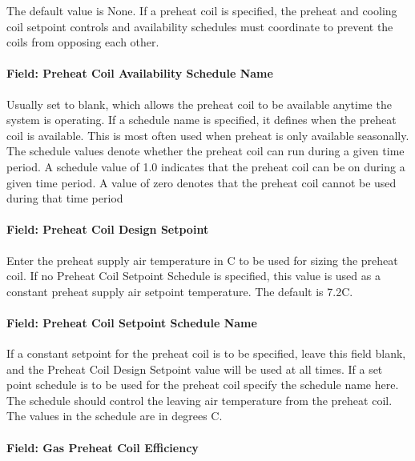 The default value is None. If a preheat coil is specified, the preheat and cooling coil setpoint controls and availability schedules must coordinate to prevent the coils from opposing each other.

\paragraph{Field: Preheat Coil Availability Schedule Name}\label{field-preheat-coil-availability-schedule-name-1}

Usually set to blank, which allows the preheat coil to be available anytime the system is operating. If a schedule name is specified, it defines when the preheat coil is available. This is most often used when preheat is only available seasonally. The schedule values denote whether the preheat coil can run during a given time period. A schedule value of 1.0 indicates that the preheat coil can be on during a given time period. A value of zero denotes that the preheat coil cannot be used during that time period

\paragraph{Field: Preheat Coil Design Setpoint}\label{field-preheat-coil-design-setpoint-1}

Enter the preheat supply air temperature in C to be used for sizing the preheat coil. If no Preheat Coil Setpoint Schedule is specified, this value is used as a constant preheat supply air setpoint temperature. The default is 7.2C.

\paragraph{Field: Preheat Coil Setpoint Schedule Name}\label{field-preheat-coil-setpoint-schedule-name-1}

If a constant setpoint for the preheat coil is to be specified, leave this field blank, and the Preheat Coil Design Setpoint value will be used at all times. If a set point schedule is to be used for the preheat coil specify the schedule name here. The schedule should control the leaving air temperature from the preheat coil. The values in the schedule are in degrees C.

\paragraph{Field: Gas Preheat Coil Efficiency}\label{field-gas-preheat-coil-efficiency-1}

